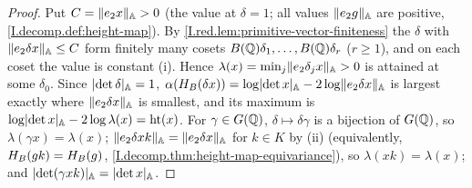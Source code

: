 \begin{theorem}
\end{theorem}
\begin{proof}
Put $C=\lVert e_2x\rVert_{\mathbb{A}}>0$ (the value at $\delta=1$; all values $\lVert e_2g\rVert_{\mathbb{A}}$ are positive, \cref{I.decomp.def:height-map}). By
\cref{I.red.lem:primitive-vector-finiteness} the $\delta$ with $\lVert e_2\delta x\rVert_{\mathbb{A}}\le C$ form finitely many cosets $B(\mathbb{Q})\delta_1,\dots,B(\mathbb{Q})\delta_r$
($r\ge1$), and on each coset the value is constant (i). Hence $\lambda(x)=\min_j\lVert e_2\delta_jx\rVert_{\mathbb{A}}>0$ is attained at some
$\delta_0$. Since $\lvert\det\delta\rvert_{\mathbb{A}}=1$, $\alpha(H_B(\delta x))=\log\lvert\det x\rvert_{\mathbb{A}}-2\log\lVert e_2\delta x\rVert_{\mathbb{A}}$ is largest exactly where
$\lVert e_2\delta x\rVert_{\mathbb{A}}$ is smallest, and its maximum is $\log\lvert\det x\rvert_{\mathbb{A}}-2\log\lambda(x)=\operatorname{ht}(x)$. For $\gamma\in G(\mathbb{Q})$,
$\delta\mapsto\delta\gamma$ is a bijection of $G(\mathbb{Q})$, so $\lambda(\gamma x)=\lambda(x)$; $\lVert e_2\delta xk\rVert_{\mathbb{A}}=\lVert e_2\delta x\rVert_{\mathbb{A}}$ for $k\in K$ by
(ii) (equivalently, $H_B(gk)=H_B(g)$, \cref{I.decomp.thm:height-map-equivariance}), so $\lambda(xk)=\lambda(x)$; and $\lvert\det(\gamma xk)\rvert_{\mathbb{A}}=\lvert\det x\rvert_{\mathbb{A}}$.
\end{proof}


